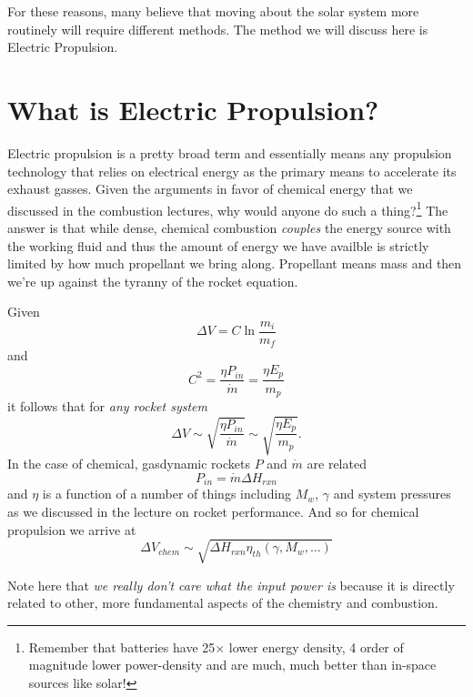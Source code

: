 \documentclass[twocolumn]{memoir} %
\begin{document}
For these reasons, many believe that moving about the solar system more routinely will require
different methods.  The method we will discuss here is Electric Propulsion.

\section{What is Electric Propulsion?}
Electric propulsion is a pretty broad term and essentially means any propulsion technology that
relies on electrical energy as the primary means to accelerate its exhaust gasses.  Given the
arguments in favor of chemical energy that we discussed in the combustion lectures, why would
anyone do such a thing?\footnote{Remember that batteries have 25$\times$ lower energy density,
4 order of magnitude lower power-density and are much, much better than in-space sources
like solar!}  The answer is that while dense, chemical combustion \emph{couples} the energy
source with the working fluid and thus the amount of energy we have availble is strictly
limited by how much propellant we bring along.  Propellant means mass and then we're up against
the tyranny of the rocket equation.  

Given
\begin{equation*}
    \Delta V = C \ln\frac{m_i}{m_f}
\end{equation*}
%
and
\begin{equation*}
    C^2 = \frac{\eta P_{in}}{\dot{m}} = \frac{\eta E_p}{m_p}
\end{equation*}
%
it follows that for \emph{any rocket system}
%
\begin{equation}
    \Delta V \sim \sqrt{\frac{\eta P_{in}}{\dot{m}}} \sim \sqrt{\frac{\eta E_p}{m_p}}.
    \label{eq:delV_P_dotm}
\end{equation}
%
In the case of chemical, gasdynamic rockets $P$ and $\dot{m}$ are related
%
\begin{equation*}
    P_{in} = \dot{m}\Delta H_{rxn}
\end{equation*}
%
and $\eta$ is a function of a number of things including $M_w$, $\gamma$ and system pressures
as we discussed in the lecture on rocket performance.  And so for chemical propulsion we arrive at
\begin{equation}
    \Delta V_{chem} \sim \sqrt{\Delta H_{rxn} \eta_{th}(\gamma, M_w, \ldots)}
\end{equation}

Note here that \emph{we really don't care what the input power is} because it is directly related
to other, more fundamental aspects of the chemistry and combustion.
\end{document}
